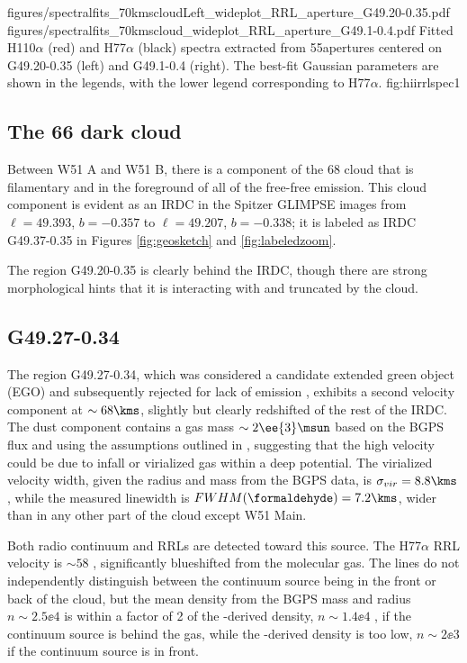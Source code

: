 \FigureTwo
{figures/spectralfits_70kmscloudLeft_wideplot_RRL_aperture_G49.20-0.35.pdf}
{figures/spectralfits_70kmscloud_wideplot_RRL_aperture_G49.1-0.4.pdf}
{Fitted H110$\alpha$ (red) and H77$\alpha$ (black) spectra extracted from
55\arcsec apertures centered on G49.20-0.35 (left) and G49.1-0.4 (right).
The best-fit Gaussian parameters are shown in the legends, with the lower
legend corresponding to H77$\alpha$.}
{fig:hiirrlspec}{1}

\subsection{The 66  \um dark cloud}
Between W51 A and W51 B, there is a component of the 68 \kms cloud that is
filamentary and in the foreground of all of the free-free emission.
This cloud component is evident as an IRDC in the Spitzer GLIMPSE images from
$\ell=49.393$, $b=-0.357$ to $\ell=49.207$, $b=-0.338$; it is labeled as IRDC
G49.37-0.35 in Figures \ref{fig:geosketch} and \ref{fig:labeledzoom}.

The \hii region G49.20-0.35 is clearly behind the IRDC, though there are strong
morphological hints that it is interacting with and truncated by the cloud.

\subsection{G49.27-0.34}
The \uchii region G49.27-0.34, which was considered a candidate extended green
object (EGO) and subsequently rejected for lack of \hh emission
\citep{De-Buizer2010a,Lee2013a}, exhibits a second velocity component at $\sim68
\kms$, slightly but clearly redshifted of the rest of the IRDC.  The dust
component contains a gas mass $\sim2\ee{3} \msun$ based on the BGPS flux and
using the assumptions
outlined in \citet{Aguirre2011a}, suggesting that the high velocity could be
due to infall or virialized gas within a deep potential.  The virialized
velocity width, given the radius and mass from the BGPS data, is
$\sigma_{vir}=8.8 \kms$, while the measured \formaldehyde linewidth is
$FWHM(\formaldehyde) = 7.2 \kms$, wider than in any other part of the cloud
except W51 Main.

Both radio continuum and RRLs are detected toward this source.  The H77$\alpha$
RRL velocity is $\sim58$ \kms, significantly blueshifted from the molecular
gas.  The \formaldehyde lines do not independently distinguish between the
continuum source being in the front or back of the cloud, but the mean density
from the BGPS mass and radius $n\sim2.5\ee{4}$ \percc is within a factor of 2
of the \formaldehyde-derived density, $n\sim1.4\ee{4}$ \percc, if the continuum
source is behind the gas, while the \formaldehyde-derived density is too low,
$n\sim2\ee{3}$ \percc if the continuum source is in front.

